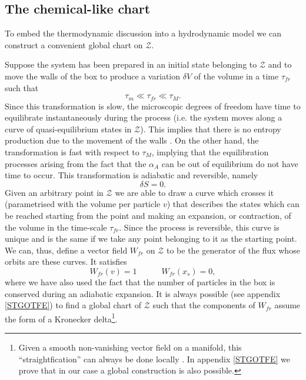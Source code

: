 \documentclass[useAMS,usenatbib,prd,twocolumn,nofootinbib]{revtex4-1}
\newcommand{\spc}{\quad \quad \quad}
\begin{document}
\subsection{The chemical-like chart}\label{GEOS}

To embed the thermodynamic discussion into a hydrodynamic model we can construct a convenient global chart on $\mathcal{Z}$. 

Suppose the system has been prepared in an initial state belonging to $\mathcal{Z}$ and to move the walls of the box to produce a variation $\delta V$ of the volume in a time $\tau_{fr}$ such that
\begin{equation}
\tau_m \ll \tau_{fr} \ll \tau_M.
\end{equation}
Since this transformation is slow, the microscopic degrees of freedom have time to equilibrate instantaneously during  the process (i.e. the system moves along a curve of quasi-equilibrium states in $\mathcal{Z}$). 
This implies that there is no entropy production due to the movement of the walls  \citep{landau5}. 
On the other hand, the transformation is fast with respect to $\tau_M$, implying that the equilibration processes arising from the fact that the $\alpha_A$ can be out of equilibrium do not have time to occur. 
This transformation is adiabatic and reversible, namely
\begin{equation}
\delta S =0.
\end{equation}
Given an arbitrary point in $\mathcal{Z}$ we are able to draw a curve which crosses it (parametrised with the volume per particle $v$) that describes the states which can be reached starting from the point and making an expansion, or contraction, of the volume in the time-scale $\tau_{fr}$. 
Since the process is reversible, this curve is unique and is the same if we take any point belonging to it as the starting point. We can, thus, define a vector field $W_{fr}$ on $\mathcal{Z}$ to be the generator of the flux whose orbits are these curves. 
It satisfies
\begin{equation}\label{itregrassi}
W_{fr}(v)=1  \spc   W_{fr}(x_s)=0,
\end{equation}
where we have also used the fact that the number of particles in the box is conserved during an adiabatic expansion. 
It is always possible (see appendix \ref{STGOTFE}) to find a global chart of $\mathcal{Z}$ such that the components of $W_{fr}$ assume the form of a Kronecker delta\footnote{
    Given a smooth non-vanishing vector field on a manifold, this ``straightfication'' can always be done locally \citep{Wald}. In appendix \ref{STGOTFE} we prove that in our case a global construction is also possible.
    }.
\end{document}
